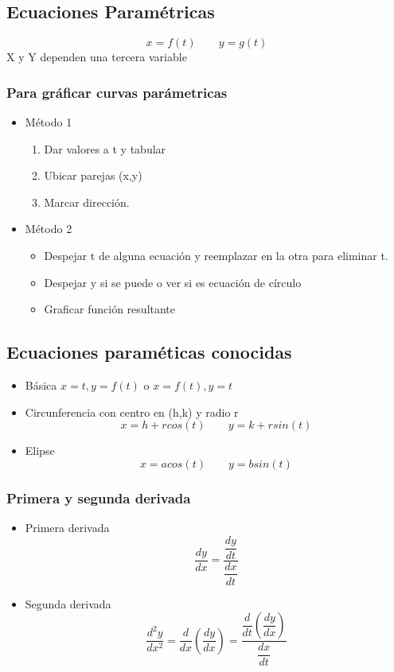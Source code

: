 \subsection{Ecuaciones Paramétricas}

$$x=f(t)\qquad y=g(t)$$
X y Y dependen una tercera variable

\subsubsection{Para gráficar curvas parámetricas}

\begin{itemize}
	\item Método 1
	\begin{enumerate}
		\item Dar valores a t y tabular
		\item Ubicar parejas (x,y)
		\item Marcar dirección.
	\end{enumerate}
	\item Método 2
	\begin{itemize}
		\item Despejar t de alguna ecuación y reemplazar en la otra para eliminar t.
		\item Despejar y si se puede o ver si es ecuación de círculo
		\item Graficar función resultante
	\end{itemize}
\end{itemize}

\subsection{Ecuaciones paraméticas conocidas}

\begin{itemize}
	\item Básica $x=t, y=f(t)$ o $x=f(t), y=t$
	\item Circunferencia con centro en (h,k) y radio r$$x=h+rcos(t)\qquad y=k+rsin(t)$$
	\item Elipse $$x=acos(t)\qquad y=bsin(t)$$
\end{itemize}

\subsubsection{Primera y segunda derivada}

\begin{itemize}
	\item Primera derivada
	$$\dfrac{dy}{dx}=\dfrac{\dfrac{dy}{dt}}{\dfrac{dx}{dt}}$$
	\item Segunda derivada
	$$\dfrac{d^2y}{dx^2}=\dfrac{d}{dx}\left( \dfrac{dy}{dx}\right) =\dfrac{\dfrac{d}{dt}\left( \dfrac{dy}{dx}\right) }{\dfrac{dx}{dt}}$$
\end{itemize}

